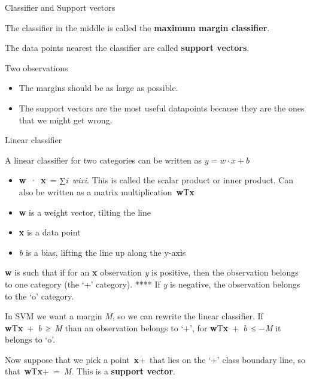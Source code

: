 \documentclass[compress]{beamer}
\begin{document}
\begin{frame}{Classifier and Support vectors}

The classifier in the middle is called the \textbf{maximum margin
classifier}.

The data points nearest the classifier are called \textbf{support
vectors}.

Two observations

\begin{itemize}

\item
  The margins should be as large as possible.
\item
  The support vectors are the most useful datapoints because they are
  the ones that we might get wrong.
\end{itemize}

\end{frame}

\begin{frame}{Linear classifier}

A linear classifier for two categories can be written as
\(y = w \cdot x + b\)

\begin{itemize}

\item
  \textbf{w}~·~\textbf{x}~= ∑\emph{i}~\emph{wixi}. This is called the
  scalar product or inner product. Can also be written as a matrix
  multiplication~\textbf{w}T\textbf{x}
\item
  \textbf{w} is a weight vector, tilting the line
\item
  \textbf{x} is a data point
\item
  \emph{b} is a bias, lifting the line up along the y-axis
\end{itemize}

\textbf{w} is such that if for an \textbf{x} observation \emph{y} is
positive, then the observation belongs to one category (the `+'
category). **** If \emph{y} is negative, the observation belongs to the
`o' category.

In SVM we want a margin \emph{M}, so we can rewrite the linear
classifier. If \textbf{w}T\textbf{x}~+~\emph{b}~≥~\emph{M} than an
observation belongs to `+', for \textbf{w}T\textbf{x}~+~\emph{b}~≤
−\emph{M} it belongs to `o'.

Now suppose that we pick a point~\textbf{x}+~that lies on the `+' class
boundary line, so that~\textbf{w}T\textbf{x}+~=~\emph{M}. This is a
\textbf{support vector}.

\end{frame}
\end{document}
